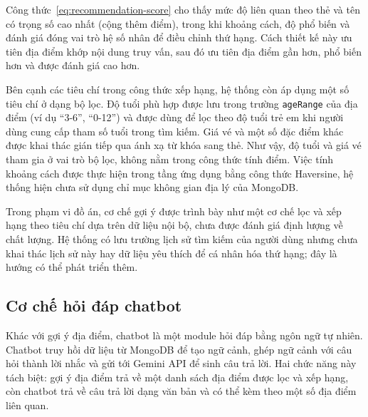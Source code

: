 ﻿\documentclass[../DoAn.tex]{subfiles}
\begin{document}
Công thức~\eqref{eq:recommendation-score} cho thấy mức độ liên quan theo thẻ và tên có trọng số cao nhất (cộng thêm điểm), trong khi khoảng cách, độ phổ biến và đánh giá đóng vai trò hệ số nhân để điều chỉnh thứ hạng. Cách thiết kế này ưu tiên địa điểm khớp nội dung truy vấn, sau đó ưu tiên địa điểm gần hơn, phổ biến hơn và được đánh giá cao hơn.

Bên cạnh các tiêu chí trong công thức xếp hạng, hệ thống còn áp dụng một số tiêu chí ở dạng bộ lọc. Độ tuổi phù hợp được lưu trong trường \texttt{ageRange} của địa điểm (ví dụ ``3-6'', ``0-12'') và được dùng để lọc theo độ tuổi trẻ em khi người dùng cung cấp tham số tuổi trong tìm kiếm. Giá vé và một số đặc điểm khác được khai thác gián tiếp qua ánh xạ từ khóa sang thẻ. Như vậy, độ tuổi và giá vé tham gia ở vai trò bộ lọc, không nằm trong công thức tính điểm. Việc tính khoảng cách được thực hiện trong tầng ứng dụng bằng công thức Haversine, hệ thống hiện chưa sử dụng chỉ mục không gian địa lý của MongoDB.

Trong phạm vi đồ án, cơ chế gợi ý được trình bày như một cơ chế lọc và xếp hạng theo tiêu chí dựa trên dữ liệu nội bộ, chưa được đánh giá định lượng về chất lượng. Hệ thống có lưu trường lịch sử tìm kiếm của người dùng nhưng chưa khai thác lịch sử này hay dữ liệu yêu thích để cá nhân hóa thứ hạng; đây là hướng có thể phát triển thêm.

\subsection{Cơ chế hỏi đáp chatbot}
\label{sec:chatbot-mechanism}

Khác với gợi ý địa điểm, chatbot là một module hỏi đáp bằng ngôn ngữ tự nhiên. Chatbot truy hồi dữ liệu từ MongoDB để tạo ngữ cảnh, ghép ngữ cảnh với câu hỏi thành lời nhắc và gửi tới Gemini API để sinh câu trả lời. Hai chức năng này tách biệt: gợi ý địa điểm trả về một danh sách địa điểm được lọc và xếp hạng, còn chatbot trả về câu trả lời dạng văn bản và có thể kèm theo một số địa điểm liên quan.
\end{document}
